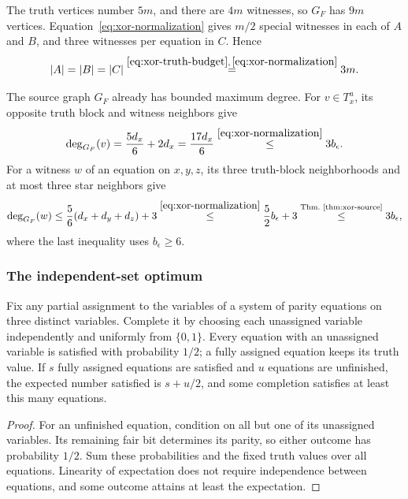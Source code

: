 The truth vertices number $5m$, and there are $4m$ witnesses, so
$G_F$ has $9m$ vertices. Equation~\eqref{eq:xor-normalization}
gives $m/2$ special witnesses in each of $A$ and $B$, and three
witnesses per equation in $C$. Hence
\begin{equation}\label{eq:xor-equal-parts}
  |A|=|B|=|C|
  \overset{\eqref{eq:xor-truth-budget},\,\eqref{eq:xor-normalization}}{=}3m.
\end{equation}

The source graph $G_F$ already has bounded maximum degree.
For $v\in T_x^a$, its opposite truth block and witness neighbors give
\[
 \deg_{G_F}(v)=\frac{5d_x}{6}+2d_x
 =\frac{17d_x}{6}
 \overset{\eqref{eq:xor-normalization}}{\leq}3b_\epsilon.
\]
For a witness $w$ of an equation on $x,y,z$, its three truth-block
neighborhoods and at most three star neighbors give
\[
 \deg_{G_F}(w)\leq\frac56(d_x+d_y+d_z)+3
 \overset{\eqref{eq:xor-normalization}}{\leq}\frac52b_\epsilon+3
 \overset{\text{Thm.~\ref{thm:xor-source}}}{\leq}3b_\epsilon,
\]
where the last inequality uses $b_\epsilon\geq6$.

\subsubsection{The independent-set optimum}

\begin{lemma}
\label{lem:partial-parity-completion}
Fix any partial assignment to the variables of a system of parity
equations on three distinct variables. Complete it by choosing each
unassigned variable independently and uniformly from $\{0,1\}$.
Every equation with an unassigned variable is satisfied with
probability $1/2$; a fully assigned equation keeps its truth value.
If $s$ fully assigned equations are satisfied and $u$ equations
are unfinished, the expected number satisfied is $s+u/2$, and
some completion satisfies at least this many equations.
\end{lemma}

\begin{proof}
For an unfinished equation, condition on all but one of its
unassigned variables. Its remaining fair bit determines its parity,
so either outcome has probability $1/2$. Sum these probabilities
and the fixed truth values over all equations. Linearity of
expectation does not require independence between equations, and
some outcome attains at least the expectation.
\end{proof}

